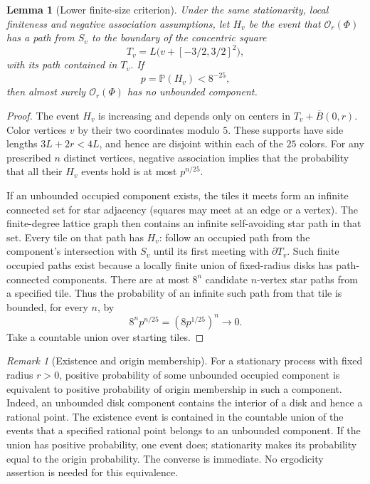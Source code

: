 \documentclass[11pt,a4paper]{article}
\newtheorem{lemma}[theorem]{Lemma}
\theoremstyle{definition}
\theoremstyle{remark}
\newtheorem{remark}[theorem]{Remark}
\numberwithin{equation}{section}
\begin{document}
\begin{lemma}[Lower finite-size criterion]\label{ell:lower-criterion}
Under the same stationarity, local finiteness and negative
association assumptions, let $H_v$ be the event that
$\mathcal O_r(\Phi)$ has a path from $S_v$ to the boundary of
the concentric square
\[
 T_v=L\bigl(v+[-3/2,3/2]^2\bigr),
\]
with its path contained in $T_v$.  If
\begin{equation}\label{ell:small-annulus}
 p=\mathbb P(H_v)<8^{-25},
\end{equation}
then almost surely $\mathcal O_r(\Phi)$ has no unbounded component.
\end{lemma}

\begin{proof}
The event $H_v$ is increasing and depends only on centers in
$T_v+\overline B(0,r)$.  Color vertices $v$ by their two
coordinates modulo $5$.  These supports have side lengths
$3L+2r<4L$, and hence are disjoint within each of the $25$
colors.  For any prescribed $n$ distinct vertices,
negative association implies that the probability that all their
$H_v$ events hold is at most $p^{n/25}$.

If an unbounded occupied component exists, the tiles it meets
form an infinite connected set for star adjacency (squares may
meet at an edge or a vertex).  The finite-degree lattice graph
then contains an infinite self-avoiding star path in that set.
Every tile on that path has $H_v$: follow an occupied path from
the component's intersection with $S_v$ until its first meeting
with $\partial T_v$.  Such finite occupied paths exist because
a locally finite union of fixed-radius disks has path-connected
components.  There are at most $8^n$ candidate $n$-vertex star
paths from a specified tile.  Thus the probability of an infinite
such path from that tile is bounded, for every $n$, by
\[
 8^n p^{n/25}=(8p^{1/25})^n\longrightarrow0.
\]
Take a countable union over starting tiles.
\end{proof}

\begin{remark}[Existence and origin membership]\label{ell:existence}
For a stationary process with fixed radius $r>0$, positive
probability of some unbounded occupied component is equivalent
to positive probability of origin membership in such a component.
Indeed, an unbounded disk component contains the interior of a
disk and hence a rational point.  The existence event is contained
in the countable union of the events that a specified rational
point belongs to an unbounded component.  If the union has
positive probability, one event does; stationarity makes its
probability equal to the origin probability.  The converse is
immediate.  No ergodicity assertion is needed for this equivalence.
\end{remark}
\end{document}
